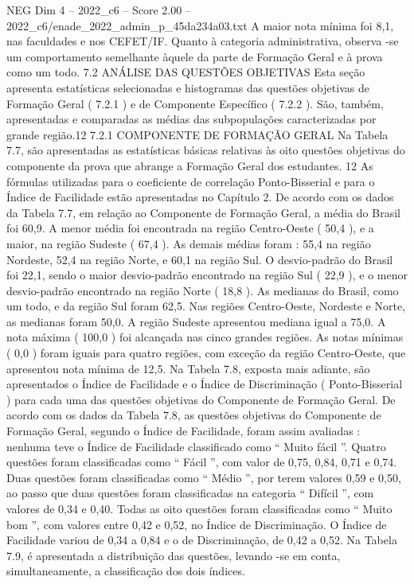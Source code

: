 \begin{textsample}{NEG Dim 4 – 2022\_c6 – Score 2.00 – 2022\_c6/enade\_2022\_admin\_p\_45da234a03.txt}
A maior nota mínima foi 8,1, nas faculdades e nos CEFET/IF.
Quanto à categoria administrativa, observa -se um comportamento semelhante àquele da parte de Formação Geral e à prova como um todo. 7.2 ANÁLISE DAS QUESTÕES OBJETIVAS Esta seção apresenta estatísticas selecionadas e histogramas das questões objetivas de Formação Geral ( 7.2.1 ) e de Componente Específico ( 7.2.2 ).
São, também, apresentadas e comparadas as médias das subpopulações caracterizadas por grande região.12 7.2.1 COMPONENTE DE FORMAÇÃO GERAL Na Tabela 7.7, são apresentadas as estatísticas básicas relativas às oito questões objetivas do componente da prova que abrange a Formação Geral dos estudantes. 12 As fórmulas utilizadas para o coeficiente de correlação Ponto-Bisserial e para o Índice de Facilidade estão apresentadas no Capítulo 2.
De acordo com os dados da Tabela 7.7, em relação ao Componente de Formação Geral, a média do Brasil foi 60,9.
A menor média foi encontrada na região Centro-Oeste ( 50,4 ), e a maior, na região Sudeste ( 67,4 ).
As demais médias foram : 55,4 na região Nordeste, 52,4 na região Norte, e 60,1 na região Sul.
O desvio-padrão do Brasil foi 22,1, sendo o maior desvio-padrão encontrado na região Sul ( 22,9 ), e o menor desvio-padrão encontrado na região Norte ( 18,8 ).
As medianas do Brasil, como um todo, e da região Sul foram 62,5.
Nas regiões Centro-Oeste, Nordeste e Norte, as medianas foram 50,0.
A região Sudeste apresentou mediana igual a 75,0.
A nota máxima ( 100,0 ) foi alcançada nas cinco grandes regiões.
As notas mínimas ( 0,0 ) foram iguais para quatro regiões, com exceção da região Centro-Oeste, que apresentou nota mínima de 12,5.
Na Tabela 7.8, exposta mais adiante, são apresentados o Índice de Facilidade e o Índice de Discriminação ( Ponto-Bisserial ) para cada uma das questões objetivas do Componente de Formação Geral.
De acordo com os dados da Tabela 7.8, as questões objetivas do Componente de Formação Geral, segundo o Índice de Facilidade, foram assim avaliadas : nenhuma teve o Índice de Facilidade classificado como “ Muito fácil ”.
Quatro questões foram classificadas como “ Fácil ”, com valor de 0,75, 0,84, 0,71 e 0,74.
Duas questões foram classificadas como “ Médio ”, por terem valores 0,59 e 0,50, ao passo que duas questões foram classificadas na categoria “ Difícil ”, com valores de 0,34 e 0,40.
Todas as oito questões foram classificadas como “ Muito bom ”, com valores entre 0,42 e 0,52, no Índice de Discriminação.
O Índice de Facilidade variou de 0,34 a 0,84 e o de Discriminação, de 0,42 a 0,52.
Na Tabela 7.9, é apresentada a distribuição das questões, levando -se em conta, simultaneamente, a classificação dos dois índices.

\end{textsample}
